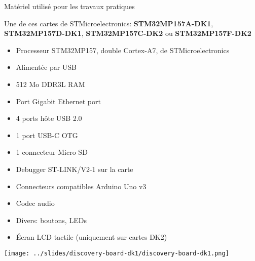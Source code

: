 \documentclass[a4paper,12pt,obeyspaces,spaces,hyphens]{article}
\begin{document}
\feshowtitle

\certificate{}
\disabilities{}

\feagendatwocolumn
{Matériel utilisé pour les travaux pratiques}
{
  Une de ces cartes de STMicroelectronics: {\bf
  STM32MP157A-DK1}, {\bf STM32MP157D-DK1}, {\bf STM32MP157C-DK2} ou
  {\bf STM32MP157F-DK2}
  \begin{itemize}
  \item Processeur STM32MP157, double Cortex-A7, de STMicroelectronics
  \item Alimentée par USB
  \item 512 Mo DDR3L RAM
  \item Port Gigabit Ethernet port
  \item 4 ports hôte USB 2.0
  \item 1 port USB-C OTG
  \item 1 connecteur Micro SD
  \item Debugger ST-LINK/V2-1 sur la carte
  \item Connecteurs compatibles Arduino Uno v3
  \item Codec audio
  \item Divers: boutons, LEDs
  \item Écran LCD tactile (uniquement sur cartes DK2)
  \end{itemize}
}{}
{
  \begin{center}
    \texttt{[image: ../slides/discovery-board-dk1/discovery-board-dk1.png]}
  \end{center}
}
\end{document}
